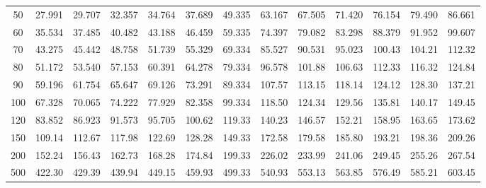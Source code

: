 \begin{table}[htbp]
\begin{tabular}{ccccccccccccc}
		50  & 27.991 & 29.707 & 32.357 & 34.764 & 37.689 & 49.335 & 63.167 & 67.505 & 71.420 & 76.154 & 79.490 & 86.661 \\
		60  & 35.534 & 37.485 & 40.482 & 43.188 & 46.459 & 59.335 & 74.397 & 79.082 & 83.298 & 88.379 & 91.952 & 99.607 \\
		70  & 43.275 & 45.442 & 48.758 & 51.739 & 55.329 & 69.334 & 85.527 & 90.531 & 95.023 & 100.43 & 104.21 & 112.32 \\
		80  & 51.172 & 53.540 & 57.153 & 60.391 & 64.278 & 79.334 & 96.578 & 101.88 & 106.63 & 112.33 & 116.32 & 124.84 \\
		90  & 59.196 & 61.754 & 65.647 & 69.126 & 73.291 & 89.334 & 107.57 & 113.15 & 118.14 & 124.12 & 128.30 & 137.21 \\
		100 & 67.328 & 70.065 & 74.222 & 77.929 & 82.358 & 99.334 & 118.50 & 124.34 & 129.56 & 135.81 & 140.17 & 149.45 \\[5pt]
		120 & 83.852 & 86.923 & 91.573 & 95.705 & 100.62 & 119.33 & 140.23 & 146.57 & 152.21 & 158.95 & 163.65 & 173.62 \\
		150 & 109.14 & 112.67 & 117.98 & 122.69 & 128.28 & 149.33 & 172.58 & 179.58 & 185.80 & 193.21 & 198.36 & 209.26 \\
		200 & 152.24 & 156.43 & 162.73 & 168.28 & 174.84 & 199.33 & 226.02 & 233.99 & 241.06 & 249.45 & 255.26 & 267.54 \\
		500 & 422.30 & 429.39 & 439.94 & 449.15 & 459.93 & 499.33 & 540.93 & 553.13 & 563.85 & 576.49 & 585.21 & 603.45 \\
		\hline
	\end{tabular}
\end{table}